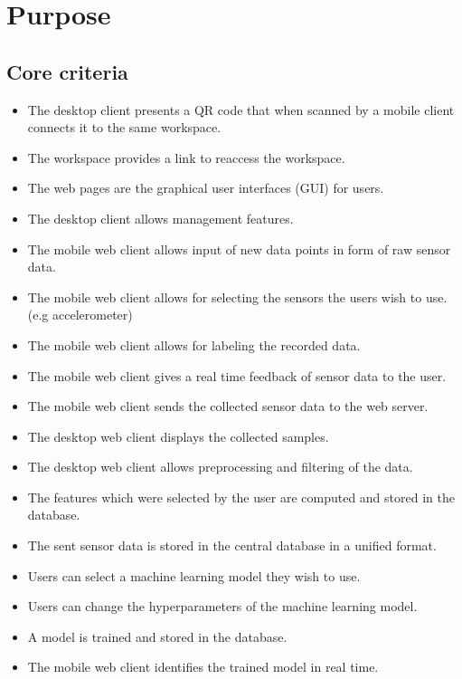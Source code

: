 \section{Purpose}




\subsection{Core criteria}
\begin{itemize}
    \item The desktop client presents a QR code that when scanned by a mobile client connects it to the same \gls{workspace}.
    \item The workspace provides a link to reaccess the workspace. 
    \item The web pages are the graphical user interfaces (GUI) for users.
    \item The desktop client allows management features.
    \item The mobile web client allows input of new data points in form of raw sensor data.
    \item The mobile web client allows for selecting the sensors the users wish to use. (e.g accelerometer)
    \item The mobile web client allows for labeling the recorded data.
    \item The mobile web client gives a real time feedback of sensor data to the user.
    \item The mobile web client sends the collected sensor data to the web server.
    \item The desktop web client displays the collected samples.
    \item The desktop web client allows preprocessing and filtering of the data.
    \item The features which were selected by the user are computed and stored in the database.
    \item The sent sensor data is stored in the central database in a unified format.
    \item Users can select a machine learning model they wish to use.
    \item Users can change the hyperparameters of the machine learning model.
    \item A model is trained and stored in the database.
    \item The mobile web client identifies the trained model in real time.
\end{itemize}
    

